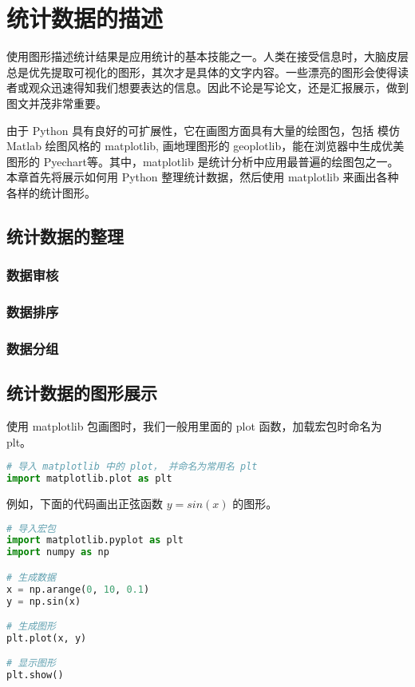 \chapter{统计数据的描述}

使用图形描述统计结果是应用统计的基本技能之一。人类在接受信息时，大脑皮层总是优先提取可视化的图形，其次才是具体的文字内容。一些漂亮的图形会使得读者或观众迅速得知我们想要表达的信息。因此不论是写论文，还是汇报展示，做到图文并茂非常重要。

由于 Python 具有良好的可扩展性，它在画图方面具有大量的绘图包，包括 模仿 Matlab 绘图风格的 matplotlib, 画地理图形的  geoplotlib，能在浏览器中生成优美图形的 Pyechart等。其中，matplotlib 是统计分析中应用最普遍的绘图包之一。本章首先将展示如何用 Python 整理统计数据，然后使用 matplotlib 来画出各种各样的统计图形。


\section{统计数据的整理}
\subsection{数据审核}

\subsection{数据排序}


\subsection{数据分组}




\section{统计数据的图形展示}

使用 matplotlib 包画图时，我们一般用里面的 plot 函数，加载宏包时命名为 plt。


\begin{lstlisting}[language=Python]
# 导入 matplotlib 中的 plot， 并命名为常用名 plt
import matplotlib.plot as plt 
\end{lstlisting}

例如，下面的代码画出正弦函数 $y=sin(x)$ 的图形。


\begin{lstlisting}[language=Python]
# 导入宏包
import matplotlib.pyplot as plt
import numpy as np

# 生成数据
x = np.arange(0, 10, 0.1)
y = np.sin(x)

# 生成图形
plt.plot(x, y)

# 显示图形
plt.show()

\end{lstlisting}




